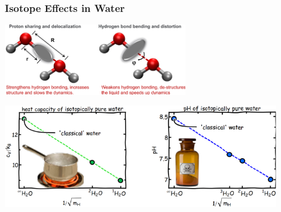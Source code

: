\begin{frame}
  \frametitle{Isotope Effects in Water}
  \begin{center}
    \includegraphics[width=0.6\textwidth]{figs/competing_quantum_effect_water_dimer.pdf}
  \end{center}
  \smallskip
  \begin{center}
    \includegraphics[width=0.9\textwidth]{figs/water_isotope_effects.pdf}
  \end{center}
\end{frame}
